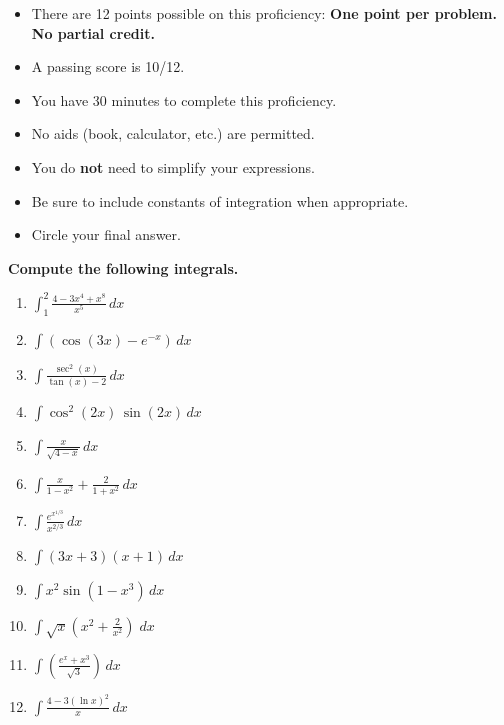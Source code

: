 \documentclass[12pt]{article}
\newcommand{\ds}{\displaystyle}
\begin{document}
\begin{itemize}
\addtolength\itemsep{-1mm}
\item There are 12 points possible on this proficiency: \textbf{One point per problem. No partial credit.}

\item A passing score is 10/12.

\item You have 30 minutes to complete this proficiency.

\item No aids (book, calculator, etc.) are permitted.  

\item You do \textbf{not} need to simplify your expressions.

\item Be sure to include constants of integration when appropriate.

\item Circle your final answer.
\end{itemize}

\noindent \textbf{Compute the following integrals.}

\begin{enumerate}
\item $\ds \int_1^2 \frac {4-3x^4+x^8}{x^5} \, dx$
\vfill

\item $\ds \int \left (\cos(3x) - e^{-x}\right ) \, dx$
\vfill

\item $\ds \int \frac {\sec^2(x)}{\tan(x)-2}\, dx $
\vfill

\newpage
\item $\ds \int \cos^2(2x) \, \sin(2x) \, dx$
\vfill

\item $\ds \int \frac{x}{\sqrt{ 4-x}} \,dx$
\vfill

\item $\ds \int \frac x{1-x^2} +\frac 2{1+x^2} \,dx$
\vfill


\newpage
\item $\ds \int \frac{e^{x^{1/3}}}{x^{2/3}} \, d x$
\vfill

\item $\ds \int (3x+3)(x+1)\,dx$
\vfill

\item $\ds \int x^2 \sin(1-x^3) \, dx$
\vfill


\newpage
\item $\ds \int \sqrt{x}(x^2+\frac{2}{x^2})\; dx$
\vfill

\item $\ds \int \left (\frac{e^x+x^3}{\sqrt{3}}\right )\, dx $
\vfill


\item $\ds \int \frac{4-3(\ln x)^2 }{x} \, dx$
\vfill


\end{enumerate}
\end{document}
